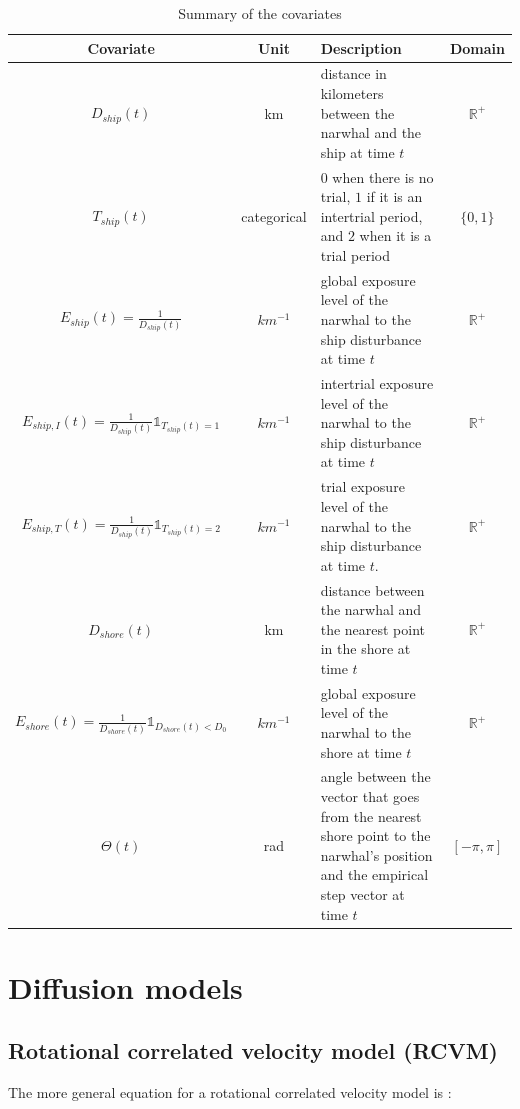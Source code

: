 \documentclass[11pt]{article}
\newcommand {\R}{\mathbb{R}}
\newcommand {\1}{\mathbb{1}}
\begin{document}
\begin{table}[H]
\centering
\begin{tabular}{|c|c|p{8cm}|c|}
\hline
Covariate & Unit & Description & Domain \\
\hline
$D_{ship}(t)$ & km & distance in kilometers between the narwhal and the ship at time $t$ & $\R^+$ \\
\hline
$T_{ship}(t)$  & categorical & $0$ when there is no trial, $1$ if it is an intertrial period, and $2$ when it is a trial period & $\{0,1\}$\\
\hline
$E_{ship}(t)=\frac{1}{D_{ship}(t)}$ & $km^{-1}$ & global exposure level of the narwhal to the ship disturbance at time $t$ & $\R^+$ \\
\hline
$E_{ship,I}(t)=\frac{1}{D_{ship}(t)}\mathbb{1}_{T_{ship}(t)=1}$& $km^{-1}$ & intertrial exposure level of the narwhal to the ship disturbance at time $t$ & $\R^+$ \\
\hline
 $E_{ship,T}(t)=\frac{1}{D_{ship}(t)}\mathbb{1}_{T_{ship}(t)=2}$ & $km^{-1}$ & trial exposure level of the narwhal to the ship disturbance at time $t$. & $\R^+$\\
 \hline
 $D_{shore}(t)$ & km & distance between the narwhal and the nearest point in the shore at time $t$ & $\R^+$ \\
 \hline
 $E_{shore}(t)=\frac{1}{D_{shore}(t)} \1_{D_{shore}(t)<D_0}$ & $km^{-1}$ & global exposure level of the narwhal to the shore at time $t$ & $\R^+$ \\
 \hline
 $\Theta(t)$ & rad & angle between the vector that goes from the nearest shore point to the narwhal's position and the empirical step vector at time $t$  & $[-\pi,\pi]$ \\
 \hline 
\end{tabular}
\caption{Summary of the covariates}
\label{tab: covariates}
\end{table}







\section{Diffusion models}

\subsection{Rotational correlated velocity model (RCVM)}
\label{section: RCVM}

The more general equation for a rotational correlated velocity model is \cite{albertsen_generalizing_2019}:
\end{document}
